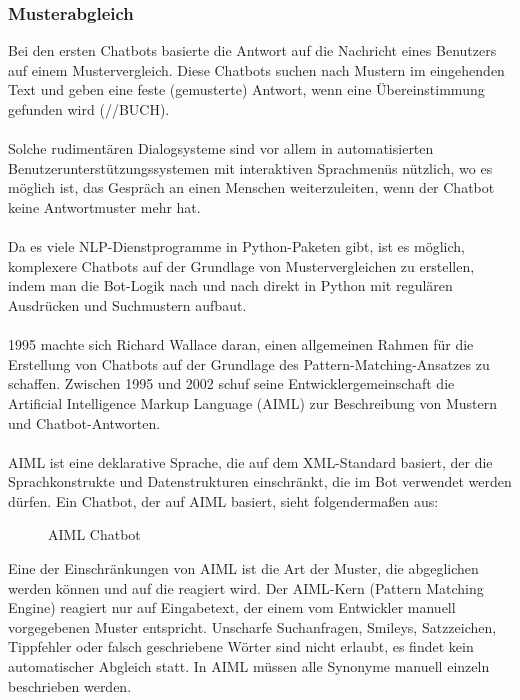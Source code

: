 \subsubsection{Musterabgleich}
Bei den ersten Chatbots basierte die Antwort auf die Nachricht eines Benutzers auf einem Mustervergleich. Diese Chatbots suchen nach Mustern im eingehenden Text und geben eine feste (gemusterte) Antwort, wenn eine Übereinstimmung gefunden wird (//BUCH).\\\\
Solche rudimentären Dialogsysteme sind vor allem in automatisierten Benutzerunterstützungssystemen mit interaktiven Sprachmenüs nützlich, wo es möglich ist, das Gespräch an einen Menschen weiterzuleiten, wenn der Chatbot keine Antwortmuster mehr hat.\\\\
Da es viele NLP-Dienstprogramme in Python-Paketen gibt, ist es möglich, komplexere Chatbots auf der Grundlage von Mustervergleichen zu erstellen, indem man die Bot-Logik nach und nach direkt in Python mit regulären Ausdrücken und Suchmustern aufbaut.\\\\
1995 machte sich Richard Wallace daran, einen allgemeinen Rahmen für die Erstellung von Chatbots auf der Grundlage des Pattern-Matching-Ansatzes zu schaffen. Zwischen 1995 und 2002 schuf seine Entwicklergemeinschaft die Artificial Intelligence Markup Language (AIML) zur Beschreibung von Mustern und Chatbot-Antworten.\\\\
AIML ist eine deklarative Sprache, die auf dem XML-Standard basiert, der die Sprachkonstrukte und Datenstrukturen einschränkt, die im Bot verwendet werden dürfen. Ein Chatbot, der auf AIML basiert, sieht folgendermaßen aus:
\begin{figure}[H]
    \centering
    \caption{\label{figure:Aiml_Bot}AIML Chatbot}
\end{figure}
\noindent
Eine der Einschränkungen von AIML ist die Art der Muster, die abgeglichen werden können und auf die reagiert wird. Der AIML-Kern (Pattern Matching Engine) reagiert nur auf Eingabetext, der einem vom Entwickler manuell vorgegebenen Muster entspricht. Unscharfe Suchanfragen, Smileys, Satzzeichen, Tippfehler oder falsch geschriebene Wörter sind nicht erlaubt, es findet kein automatischer Abgleich statt. In AIML müssen alle Synonyme manuell einzeln beschrieben werden.
